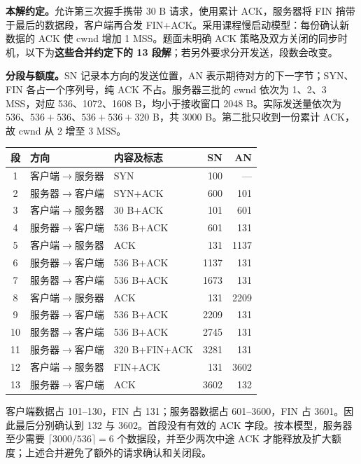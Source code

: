 \begin{checkedsolution}
\textbf{本解约定。}允许第三次握手携带 30 B 请求，使用累计 ACK，服务器将 FIN 捎带于最后的数据段，客户端再合发 FIN+ACK。采用课程慢启动模型：每份确认新数据的 ACK 使 cwnd 增加 1 MSS。题面未明确 ACK 策略及双方关闭的同步时机，以下为\textbf{这些合并约定下的 13 段解}；若另外要求分开发送，段数会改变。

\textbf{分段与额度。}SN 记录本方向的发送位置，AN 表示期待对方的下一字节；SYN、FIN 各占一个序列号，纯 ACK 不占。服务器三批的 cwnd 依次为 1、2、3 MSS，对应 536、1072、1608 B，均小于接收窗口 2048 B。实际发送量依次为 $536$、$536+536$、$536+536+320$ B，共 3000 B。第二批只收到一份累计 ACK，故 cwnd 从 2 增至 3 MSS。

\begin{center}
\small
\begin{tabular}{@{}cllrr@{}}
\toprule
段 & 方向 & 内容及标志 & SN & AN \\
\midrule
1 & 客户端$\to$服务器 & SYN & 100 & --- \\
2 & 服务器$\to$客户端 & SYN+ACK & 600 & 101 \\
3 & 客户端$\to$服务器 & 30 B+ACK & 101 & 601 \\
4 & 服务器$\to$客户端 & 536 B+ACK & 601 & 131 \\
5 & 客户端$\to$服务器 & ACK & 131 & 1137 \\
6 & 服务器$\to$客户端 & 536 B+ACK & 1137 & 131 \\
7 & 服务器$\to$客户端 & 536 B+ACK & 1673 & 131 \\
8 & 客户端$\to$服务器 & ACK & 131 & 2209 \\
9 & 服务器$\to$客户端 & 536 B+ACK & 2209 & 131 \\
10 & 服务器$\to$客户端 & 536 B+ACK & 2745 & 131 \\
11 & 服务器$\to$客户端 & 320 B+FIN+ACK & 3281 & 131 \\
12 & 客户端$\to$服务器 & FIN+ACK & 131 & 3602 \\
13 & 服务器$\to$客户端 & ACK & 3602 & 132 \\
\bottomrule
\end{tabular}
\end{center}

客户端数据占 101--130，FIN 占 131；服务器数据占 601--3600，FIN 占 3601。因此最后分别确认到 132 与 3602。首段没有有效的 ACK 字段。按本模型，服务器至少需要 $\lceil3000/536\rceil=6$ 个数据段，并至少两次中途 ACK 才能释放及扩大额度；上述合并避免了额外的请求确认和关闭段。
\end{checkedsolution}

